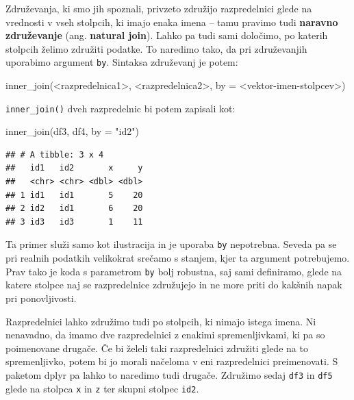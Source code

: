 \documentclass[
]{book}
\newenvironment{Shaded}{\begin{snugshade}}{\end{snugshade}}
\newcommand{\AttributeTok}[1]{\textcolor[rgb]{0.77,0.63,0.00}{#1}}
\newcommand{\FunctionTok}[1]{\textcolor[rgb]{0.00,0.00,0.00}{#1}}
\newcommand{\NormalTok}[1]{#1}
\newcommand{\SpecialCharTok}[1]{\textcolor[rgb]{0.00,0.00,0.00}{#1}}
\newcommand{\StringTok}[1]{\textcolor[rgb]{0.31,0.60,0.02}{#1}}
\begin{document}
Združevanja, ki smo jih spoznali, privzeto združijo razpredelnici glede na vrednosti v vseh stolpcih, ki imajo enaka imena -- tamu pravimo tudi \textbf{naravno združevanje} (ang. \textbf{natural join}). Lahko pa tudi sami določimo, po katerih stolpcih želimo združiti podatke. To naredimo tako, da pri združevanjih uporabimo argument \texttt{by}. Sintaksa združevanj je potem:

\begin{Shaded}
\begin{Highlighting}[]
\FunctionTok{inner\_join}\NormalTok{(}\SpecialCharTok{\textless{}}\NormalTok{razpredelnica1}\SpecialCharTok{\textgreater{}}\NormalTok{, }\SpecialCharTok{\textless{}}\NormalTok{razpredelnica2}\SpecialCharTok{\textgreater{}}\NormalTok{, }\AttributeTok{by =} \SpecialCharTok{\textless{}}\NormalTok{vektor}\SpecialCharTok{{-}}\NormalTok{imen}\SpecialCharTok{{-}}\NormalTok{stolpcev}\SpecialCharTok{\textgreater{}}\NormalTok{)}
\end{Highlighting}
\end{Shaded}

\texttt{inner\_join()} dveh razpredelnic bi potem zapisali kot:

\begin{Shaded}
\begin{Highlighting}[]
\FunctionTok{inner\_join}\NormalTok{(df3, df4, }\AttributeTok{by =} \StringTok{"id2"}\NormalTok{)}
\end{Highlighting}
\end{Shaded}

\begin{verbatim}
## # A tibble: 3 x 4
##   id1   id2       x     y
##   <chr> <chr> <dbl> <dbl>
## 1 id1   id1       5    20
## 2 id2   id1       6    20
## 3 id3   id3       1    11
\end{verbatim}

Ta primer služi samo kot ilustracija in je uporaba \texttt{by} nepotrebna. Seveda pa se pri realnih podatkih velikokrat srečamo s stanjem, kjer ta argument potrebujemo. Prav tako je koda s parametrom \texttt{by} bolj robustna, saj sami definiramo, glede na katere stolpce naj se razpredelnice združujejo in ne more priti do kakšnih napak pri ponovljivosti.

Razpredelnici lahko združimo tudi po stolpcih, ki nimajo istega imena. Ni nenavadno, da imamo dve razpredelnici z enakimi spremenljivkami, ki pa so poimenovane drugače. Če bi želeli taki razpredelnici združiti glede na to spremenljivko, potem bi jo morali načeloma v eni razpredelnici preimenovati. S paketom dplyr pa lahko to naredimo tudi drugače. Združimo sedaj \texttt{df3} in \texttt{df5} glede na stolpca \texttt{x} in \texttt{z} ter skupni stolpec \texttt{id2}.
\end{document}
